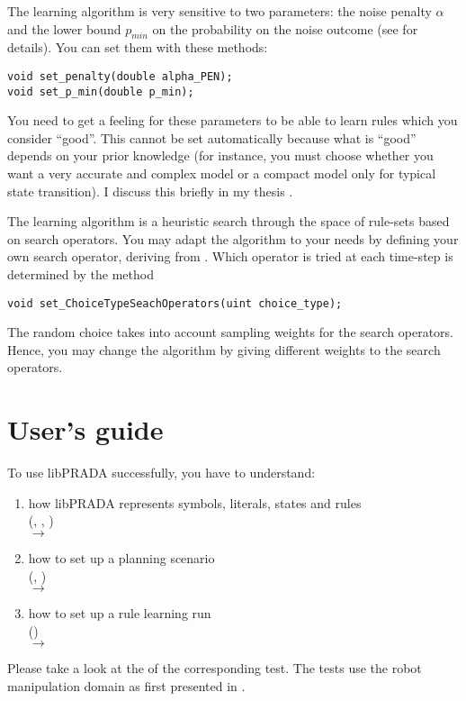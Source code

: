 \documentclass[10pt,twoside,twocolumn,fleqn]{article}
\begin{document}
The learning algorithm is very sensitive to two parameters: the noise
penalty $\alpha$ and the lower bound $p_{min}$ on the probability on the
noise outcome (see \cite{lang-toussaint-10jair,pasula07ai} for details).
You can set them with these methods:
\begin{lstlisting}
void set_penalty(double alpha_PEN);
void set_p_min(double p_min);
\end{lstlisting}
You need to get a feeling for these parameters to be able to learn rules
which you consider ``good''. This cannot be set automatically because what
is ``good'' depends on your prior knowledge (for instance, you must choose
whether you want a very accurate and complex model or a compact model only
for typical state transition). I discuss this briefly in my thesis
\cite{11-lang-phd}.

The learning algorithm is a heuristic search through the space of
rule-sets based on search operators. You may adapt the algorithm to your
needs by defining your own search operator, deriving from
. Which operator is tried at each time-step is
determined by the method
\begin{lstlisting}
void set_ChoiceTypeSeachOperators(uint choice_type);
\end{lstlisting}
The random choice takes into account sampling weights for the search
operators. Hence, you may change the algorithm by giving different weights
to the search operators.





\section{User's guide}

To use libPRADA successfully, you have to understand:
\begin{enumerate}
\item how libPRADA represents symbols, literals, states and rules \\
(, ,
) \\
$\to$ 

\item  how to set up a planning scenario \\
(, ) \\
$\to$ 

\item how to set up a rule learning run \\
() \\
$\to$ 
\end{enumerate}
Please take a look at the  of the corresponding test.  The
tests use the robot manipulation domain as first presented in
\cite{lang-toussaint-10jair}.
\end{document}
